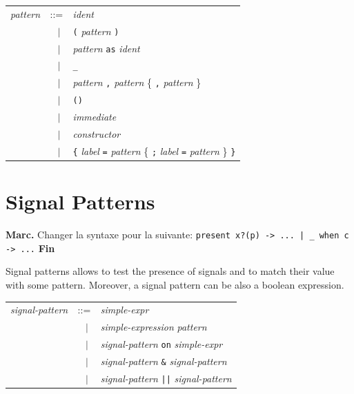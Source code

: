 \documentclass[11pt,titlepage,twoside]{report}
\newcommand{\alt}{\;|\;}
\newcommand{\Marc}[1]{{\bf Marc.} {#1} {\bf Fin}}
\newcommand{\term}[1]{{\tt #1}}
\newcommand{\nterm}[1]{{\em #1}}
\begin{document}
\begin{center}
\begin{tabular}{lcl}
\nterm{pattern} & ::=        & \nterm{ident} \\
                & $\;\;\alt$ & \term{(} \nterm{pattern} \term{)} \\
                & $\;\;\alt$ & \nterm{pattern} \term{as} \nterm{ident} \\
                & $\;\;\alt$ & \term{\_} \\
                & $\;\;\alt$ & \nterm{pattern} \term{,} \nterm{pattern} 
                               \{ \term{,} \nterm{pattern} \} \\
                & $\;\;\alt$ & \term{()} \\
                & $\;\;\alt$ & \nterm{immediate} \\
                & $\;\;\alt$ & \nterm{constructor} \\
                & $\;\;\alt$ & \term{\{} \nterm{label} 
                               \term{=} \nterm{pattern} \{ \term{;} 
                               \nterm{label} \term{=} \nterm{pattern}
                               \} \term{\}}
\end{tabular}
\end{center}

\section{Signal Patterns}

\Marc{Changer la syntaxe pour la
  suivante: \texttt{present x?(p) -> ... | \_ when c -> ...}}

Signal patterns allows to test the presence of signals and to match
their value with some pattern. Moreover, a signal pattern can be also
a boolean expression.
\begin{center}
\begin{tabular}{lcl}
\nterm{signal-pattern} 
   & ::=        & \nterm{simple-expr} \\
   & $\;\;\alt$ & \nterm{simple-expression} \nterm{pattern} \\ 
   & $\;\;\alt$ & \nterm{signal-pattern} \term{on} \nterm{simple-expr} \\
   & $\;\;\alt$ & \nterm{signal-pattern} \term{\&} \nterm{signal-pattern} \\
   & $\;\;\alt$ & \nterm{signal-pattern} \term{||} \nterm{signal-pattern}
\end{tabular}
\end{center}
\end{document}
